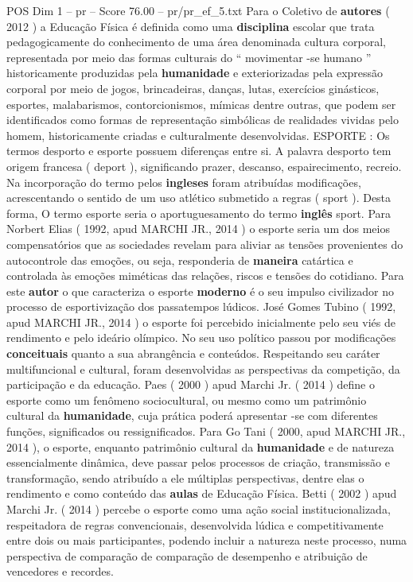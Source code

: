 \begin{textsample}{POS Dim 1 – pr – Score 76.00 – pr/pr\_ef\_5.txt}
Para o Coletivo de \textbf{autores} ( 2012 ) a Educação Física é definida como uma \textbf{disciplina} escolar que trata pedagogicamente do conhecimento de uma área denominada cultura corporal, representada por meio das formas culturais do “ movimentar -se humano ” historicamente produzidas pela \textbf{humanidade} e exteriorizadas pela expressão corporal por meio de jogos, brincadeiras, danças, lutas, exercícios ginásticos, esportes, malabarismos, contorcionismos, mímicas dentre outras, que podem ser identificados como formas de representação simbólicas de realidades vividas pelo homem, historicamente criadas e culturalmente desenvolvidas.
ESPORTE : Os termos desporto e esporte possuem diferenças entre si.
A palavra desporto tem origem francesa ( deport ), significando prazer, descanso, espairecimento, recreio.
Na incorporação do termo pelos \textbf{ingleses} foram atribuídas modificações, acrescentando o sentido de um uso atlético submetido a regras ( sport ).
Desta forma, O termo esporte seria o aportuguesamento do termo \textbf{inglês} sport.
Para Norbert Elias ( 1992, apud MARCHI JR., 2014 ) o esporte seria um dos meios compensatórios que as sociedades revelam para aliviar as tensões provenientes do autocontrole das emoções, ou seja, responderia de \textbf{maneira} catártica e controlada às emoções miméticas das relações, riscos e tensões do cotidiano.
Para este \textbf{autor} o que caracteriza o esporte \textbf{moderno} é o seu impulso civilizador no processo de esportivização dos passatempos lúdicos.
José Gomes Tubino ( 1992, apud MARCHI JR., 2014 ) o esporte foi percebido inicialmente pelo seu viés de rendimento e pelo ideário olímpico.
No seu uso político passou por modificações \textbf{conceituais} quanto a sua abrangência e conteúdos.
Respeitando seu caráter multifuncional e cultural, foram desenvolvidas as perspectivas da competição, da participação e da educação.
Paes ( 2000 ) apud Marchi Jr. ( 2014 ) define o esporte como um fenômeno sociocultural, ou mesmo como um patrimônio cultural da \textbf{humanidade}, cuja prática poderá apresentar -se com diferentes funções, significados ou ressignificados.
Para Go Tani ( 2000, apud MARCHI JR., 2014 ), o esporte, enquanto patrimônio cultural da \textbf{humanidade} e de natureza essencialmente dinâmica, deve passar pelos processos de criação, transmissão e transformação, sendo atribuído a ele múltiplas perspectivas, dentre elas o rendimento e como conteúdo das \textbf{aulas} de Educação Física.
Betti ( 2002 ) apud Marchi Jr. ( 2014 ) percebe o esporte como uma ação social institucionalizada, respeitadora de regras convencionais, desenvolvida lúdica e competitivamente entre dois ou mais participantes, podendo incluir a natureza neste processo, numa perspectiva de comparação de comparação de desempenho e atribuição de vencedores e recordes.

\end{textsample}
